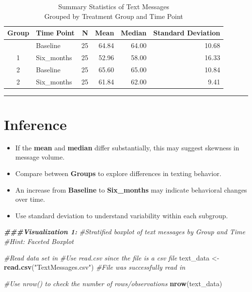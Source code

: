 \documentclass[
]{article}
\newenvironment{Shaded}{\begin{snugshade}}{\end{snugshade}}
\newcommand{\CommentTok}[1]{\textcolor[rgb]{0.56,0.35,0.01}{\textit{#1}}}
\newcommand{\DocumentationTok}[1]{\textcolor[rgb]{0.56,0.35,0.01}{\textbf{\textit{#1}}}}
\newcommand{\FunctionTok}[1]{\textcolor[rgb]{0.13,0.29,0.53}{\textbf{#1}}}
\newcommand{\NormalTok}[1]{#1}
\newcommand{\OtherTok}[1]{\textcolor[rgb]{0.56,0.35,0.01}{#1}}
\newcommand{\StringTok}[1]{\textcolor[rgb]{0.31,0.60,0.02}{#1}}
\providecommand{\tightlist}{%
  \setlength{\itemsep}{0pt}\setlength{\parskip}{0pt}}
\begin{document}
\begin{table}[!t]
\caption*{
{\large Summary Statistics of Text Messages} \\ 
{\small Grouped by Treatment Group and Time Point}
} 
\fontsize{9.0pt}{10.8pt}\selectfont
\begin{tabular*}{\linewidth}{@{\extracolsep{\fill}}clrrrr}
\toprule
Group & Time Point & N & Mean & Median & Standard Deviation \\ 
\midrule\addlinespace[2.5pt]
1 & Baseline & 25 & 64.84 & 64.00 & 10.68 \\ 
1 & Six\_months & 25 & 52.96 & 58.00 & 16.33 \\ 
2 & Baseline & 25 & 65.60 & 65.00 & 10.84 \\ 
2 & Six\_months & 25 & 61.84 & 62.00 & 9.41 \\ 
\bottomrule
\end{tabular*}
\end{table}

\begin{center}\rule{0.5\linewidth}{0.5pt}\end{center}

\section{Inference}\label{inference}

\begin{itemize}
\tightlist
\item
  If the \textbf{mean} and \textbf{median} differ substantially, this
  may suggest skewness in message volume.
\item
  Compare between \textbf{Groups} to explore differences in texting
  behavior.
\item
  An increase from \textbf{Baseline} to \textbf{Six\_months} may
  indicate behavioral changes over time.
\item
  Use standard deviation to understand variability within each subgroup.
\end{itemize}

\begin{Shaded}
\begin{Highlighting}[]
\DocumentationTok{\#\#\#Visualization 1:}
\CommentTok{\#Stratified boxplot of text messages by Group and Time}
\CommentTok{\#Hint: Faceted Boxplot}

\CommentTok{\#Read data set in}
\CommentTok{\#Use read.csv since the file is a csv file}
\NormalTok{text\_data }\OtherTok{\textless{}{-}} \FunctionTok{read.csv}\NormalTok{(}\StringTok{"TextMessages.csv"}\NormalTok{)}
\CommentTok{\#File was successfully read in}

\CommentTok{\#Use nrow() to check the number of rows/observations}
\FunctionTok{nrow}\NormalTok{(text\_data)}
\end{Highlighting}
\end{Shaded}
\end{document}
